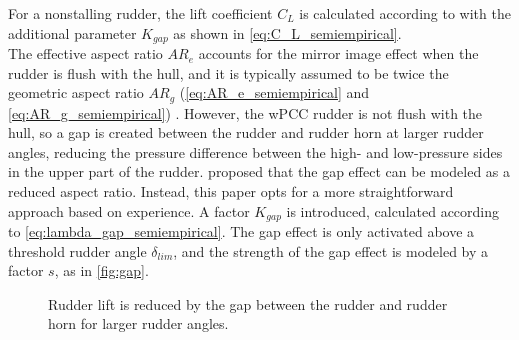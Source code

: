 For a nonstalling rudder, the lift coefficient $C_L$ is calculated according to \textcite{whickerFreeStreamCharacteristicsFamily1958} with the additional parameter $K_{gap}$ as shown in \autoref{eq:C_L_semiempirical}.
\begin{equation}
    \label{eq:C_L_semiempirical}
    
\end{equation}
%
\begin{equation}
    \label{eq:alpha_semiempirical}
    
\end{equation}
The effective aspect ratio $AR_e$ accounts for the mirror image effect when the rudder is flush with the hull, and it is typically assumed to be twice the geometric aspect ratio $AR_g$ (\autoref{eq:AR_e_semiempirical} and \autoref{eq:AR_g_semiempirical}) \cite{hughesTEMPESTLevel0Theory2011}.
However, the wPCC rudder is not flush with the hull, so a gap is created between the rudder and rudder horn at larger rudder angles, reducing the pressure difference between the high- and low-pressure sides in the upper part of the rudder. \textcite{matusiakDynamicsRigidShip2021} proposed that the gap effect can be modeled as a reduced aspect ratio. Instead, this paper opts for a more straightforward approach based on experience. A factor $K_{gap}$ is introduced, calculated according to \autoref{eq:lambda_gap_semiempirical}. The gap effect is only activated above a threshold rudder angle $\delta_{lim}$, and the strength of the gap effect is modeled by a factor $s$, as in \autoref{fig:gap}.
%
\begin{equation}
    \label{eq:AR_g_semiempirical}
    
\end{equation}
%
\begin{equation}
    \label{eq:AR_e_semiempirical}
    
\end{equation}
%
\begin{equation}
    \label{eq:lambda_gap_semiempirical}
    
\end{equation}
\begin{figure}[h]
    \centering
    
    \caption{Rudder lift is reduced by the gap between the rudder and rudder horn for larger rudder angles.}
    \label{fig:gap}
\end{figure}
\FloatBarrier

